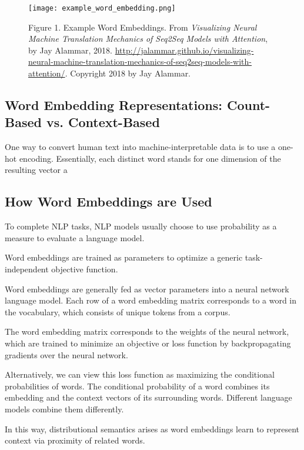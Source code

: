 \begin{figure}[h]
\centering
\texttt{[image: example\_word\_embedding.png]}
\caption{Figure 1. Example Word Embeddings. From \emph{Visualizing Neural Machine Translation Mechanics of Seq2Seq Models with Attention}, by Jay Alammar, 2018. \url{http://jalammar.github.io/visualizing-neural-machine-translation-mechanics-of-seq2seq-models-with-attention/}. Copyright 2018 by Jay Alammar.}
\end{figure}


\subsection{Word Embedding Representations: Count-Based vs. Context-Based}

One way to convert human text into machine-interpretable data is to use a one-hot encoding. Essentially, each distinct word stands for one dimension of the resulting vector a




\subsection{How Word Embeddings are Used}

To complete NLP tasks, NLP models usually choose to use probability as a measure to evaluate a language model. 

Word embeddings are trained as parameters to optimize a generic task-independent objective function. 

Word embeddings are generally fed as vector parameters into a neural network language model. Each row of a word embedding matrix corresponds to a word in the vocabulary, which consists of unique tokens from a corpus. 

The word embedding matrix corresponds to the weights of the neural network, which are trained to minimize an objective or loss function by backpropagating gradients over the neural network. 

Alternatively, we can view this loss function as maximizing the conditional probabilities of words. The conditional probability of a word combines its embedding and the context vectors of its surrounding words. Different language models combine them differently. 

In this way, distributional semantics arises as word embeddings learn to represent context via proximity of related words.  
